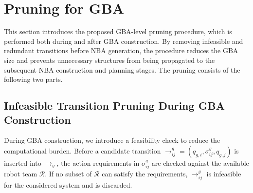\documentclass[lettersize,journal]{IEEEtran}
\theoremstyle{italiclemma}
\theoremstyle{italiclemma}
\theoremstyle{definition}
\begin{document}
\section{Pruning for GBA} \label{sec:gba_pruning}

This section introduces the proposed GBA-level pruning procedure, which is performed both during and after GBA construction. By removing infeasible and redundant transitions before NBA generation, the procedure reduces the GBA size and prevents unnecessary structures from being propagated to the subsequent NBA construction and planning stages. The pruning consists of the following two parts.

\subsection{Infeasible Transition Pruning During GBA Construction}  \label{subsec:infeasible_gba_pruning}
During GBA construction, we introduce a feasibility check to reduce the computational burden.
Before a candidate transition $\rightarrow^g_{ij}=(q_{g,i},\sigma^g_{ij},q_{g,j})$
is inserted into \(\rightarrow_g\), the action requirements in
\(\sigma^g_{ij}\) are checked against the available robot team \(\mathcal{R}\). If no subset of \(\mathcal{R}\) can satisfy the  requirements, \(\rightarrow^g_{ij}\) is infeasible for the considered system and is discarded.
\end{document}
